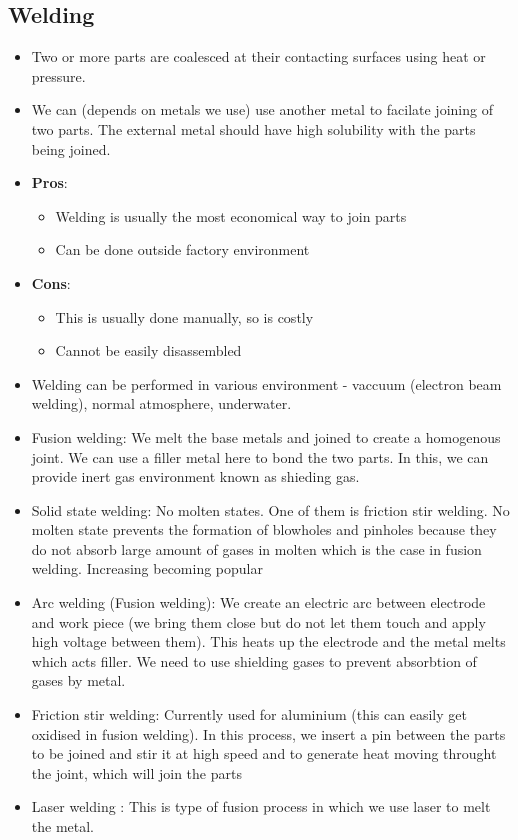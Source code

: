 \documentclass{article}
\begin{document}
	\subsection{Welding}
		\begin{itemize}
			\item Two or more parts are coalesced at their contacting surfaces using heat or pressure. 
			\item We can (depends on metals we use) use another metal to facilate joining of two parts. The external metal should have high solubility with the parts being joined.
			\item \textbf{Pros}:
				\begin{itemize}
					\item Welding is usually the most economical way to join parts
					\item Can be done outside factory environment
				\end{itemize}
			\item \textbf{Cons}:
				\begin{itemize}
					\item This is usually done manually, so is costly
					\item Cannot be easily disassembled
				\end{itemize}

			\item Welding can be performed in various environment - vaccuum (electron beam welding), normal atmosphere, underwater.
			\item Fusion welding: We melt the base metals and joined to create a homogenous joint. We can use a filler metal here to bond the two parts. In this, we can provide inert gas environment known as shieding gas. 
			\item Solid state welding: No molten states. One of them is friction stir welding. No molten state prevents the formation of blowholes and pinholes because they do not absorb large amount of gases in molten which is the case in fusion welding. Increasing becoming popular

			\item {Arc welding (Fusion welding)}: We create an electric arc between electrode and work piece (we bring them close but do not let them touch and apply high voltage between them). This heats up the electrode and the metal melts which acts filler. We need to use shielding gases to prevent absorbtion of gases by metal.
			\item Friction stir welding: Currently used for aluminium (this can easily get oxidised in fusion welding). In this process, we insert a pin between the parts to be joined and stir it at high speed and  to generate heat moving throught the joint, which will join the parts
			\item Laser welding : This is type of fusion process in which we use laser to melt the metal.

		\end{itemize}
		
\end{document}
